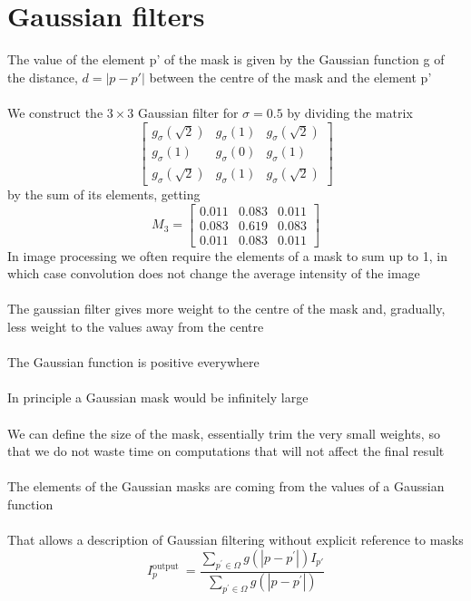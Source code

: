 \documentclass{article}[18pt]
\begin{document}
\section{Gaussian filters}
The value of the element p' of the mask is given by the Gaussian function g of the distance, $d=|p-p'|$ between the centre of the mask and the element p'\\
\\
We construct the $3\times 3$ Gaussian filter for $\sigma=0.5$ by dividing the matrix
\[
\left[\begin{array}{ccc}{g_{\sigma}(\sqrt{2})} & {g_{\sigma}(1)} & {g_{\sigma}(\sqrt{2})} \\ {g_{\sigma}(1)} & {g_{\sigma}(0)} & {g_{\sigma}(1)} \\ {g_{\sigma}(\sqrt{2})} & {g_{\sigma}(1)} & {g_{\sigma}(\sqrt{2})}\end{array}\right]
\]
by the sum of its elements, getting
\[
M_{3}=\left[\begin{array}{ccc}{0.011} & {0.083} & {0.011} \\ {0.083} & {0.619} & {0.083} \\ {0.011} & {0.083} & {0.011}\end{array}\right]
\]
In image processing we often require the elements of a mask to sum up to 1, in which case convolution does not change the average intensity of the image\\
\\
The gaussian filter gives more weight to the centre of the mask and, gradually, less weight to the values away from the centre\\
\\
The Gaussian function is positive everywhere\\
\\
In principle a Gaussian mask would be infinitely large\\
\\
We can define the size of the mask, essentially trim the very small weights, so that we do not waste time on computations that will not affect the final result\\
\\
The elements of the Gaussian masks are coming from the values of a Gaussian function\\
\\
That allows a description of Gaussian filtering without explicit reference to masks
\[
I_{p}^{\text {output }}=\frac{\sum_{p^{\prime} \in \Omega} g\left(\left|p-p^{\prime}\right|\right) I_{p \prime}}{\sum_{p^{\prime} \in \Omega} g\left(\left|p-p^{\prime}\right|\right)}
\]
\end{document}
